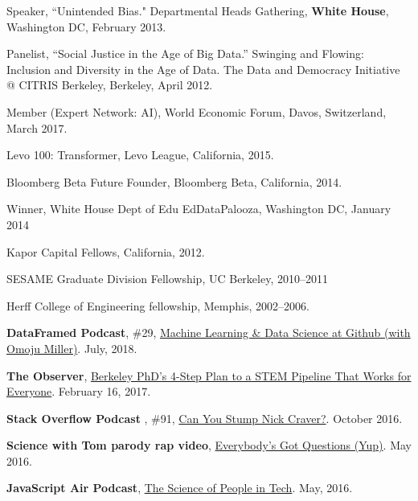 \documentclass[11pt,article,oneside]{memoir}
\begin{document}
\ind Speaker, ``Unintended Bias." Departmental Heads Gathering, \textbf{White House}, Washington DC, February 2013.

\ind Panelist, ``Social Justice in the Age of Big Data.'' Swinging and Flowing: Inclusion and Diversity in the Age of Data. The Data and Democracy Initiative @ CITRIS Berkeley, Berkeley, April 2012.

\bigskip

\medskip

\ind Member (Expert Network: AI), World Economic Forum, Davos, Switzerland, March 2017.

\ind Levo 100: Transformer, Levo League, California, 2015.

\ind Bloomberg Beta Future Founder, Bloomberg Beta, California, 2014.

\ind Winner, White House Dept of Edu EdDataPalooza, Washington DC, January 2014

\ind Kapor Capital Fellows, California, 2012.

\ind SESAME Graduate Division Fellowship, UC Berkeley, 2010--2011

\ind Herff College of Engineering fellowship, Memphis, 2002--2006.

\bigskip

\medskip

\ind \textbf{DataFramed Podcast}, \#29, \href{https://www.datacamp.com/community/podcast/machine-learning-github}{Machine Learning \& Data Science at Github (with Omoju Miller)}. July, 2018.

\ind \textbf{The Observer}, \href{http://observer.com/2017/02/omoju-miller-etsy-stem-pipeline/}{Berkeley PhD's 4-Step Plan to a STEM Pipeline That Works for Everyone}. February 16, 2017.

\ind \textbf{Stack Overflow Podcast }, \#91, \href{https://soundcloud.com/stack-exchange/stack-overflow-podcast-91-can-you-stump-nick-craver}{Can You Stump Nick Craver?}. October 2016.

\ind \textbf{Science with Tom parody rap video}, \href{https://www.youtube.com/watch?v=q5mmE05e82I&ab_channel=ScienceWithTom}{Everybody's Got Questions (Yup)}. May 2016.

\ind \textbf{JavaScript Air Podcast}, \href{http://audio.javascriptair.com/e/022-jsair-the-science-of-people-in-tech-with-kate-edwards-omoju-miller-and-steve-andrews/}{The Science of People in Tech}. May, 2016.
\end{document}
